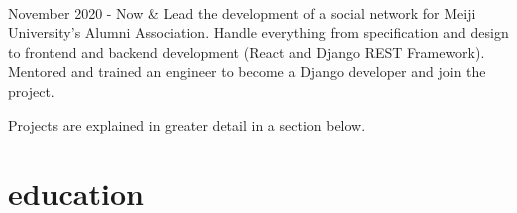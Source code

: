 \documentclass[]{cv-roald}
\begin{document}
\begin{tabularcv}
                    \\[\vspacepar]
  November 2020 - Now   & 
                    \newline Lead the development of a social network for Meiji University's Alumni Association. Handle everything from specification and design to frontend and backend development (React and Django REST Framework).
                    \newline Mentored and trained an engineer to become a Django developer and join the project.
\end{tabularcv}

Projects are explained in greater detail in a section below.

\section*{education}
\end{document}

